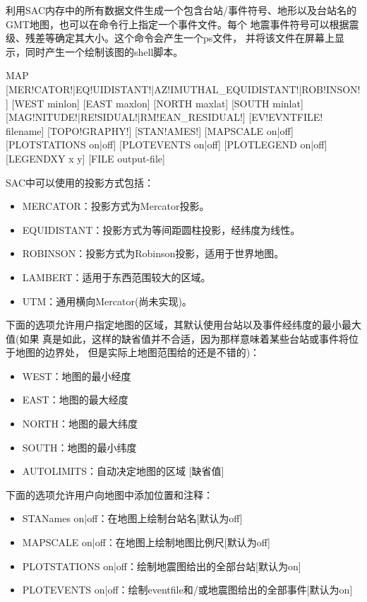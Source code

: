 \label{cmd:map}

利用SAC内存中的所有数据文件生成一个包含台站/事件符号、地形以及台站名的
GMT地图，也可以在命令行上指定一个事件文件。每个
地震事件符号可以根据震级、残差等确定其大小。这个命令会产生一个ps文件，
并将该文件在屏幕上显示，同时产生一个绘制该图的shell脚本。

\begin{SACSTX}
MAP [MER!CATOR!|EQ!UIDISTANT!|AZ!IMUTHAL_EQUIDISTANT!|ROB!INSON!]
    [WEST minlon] [EAST maxlon] [NORTH maxlat] [SOUTH minlat]
    [MAG!NITUDE!|RE!SIDUAL!|RM!EAN_RESIDUAL!] [EV!EVNTFILE! filename]
    [TOPO!GRAPHY!] [STAN!AMES!] [MAPSCALE on|off] [PLOTSTATIONS on|off]
    [PLOTEVENTS on|off] [PLOTLEGEND on|off] [LEGENDXY x y]
    [FILE output-file]
\end{SACSTX}

SAC中可以使用的投影方式包括：
\begin{itemize}
\item MERCATOR：投影方式为Mercator投影。
\item EQUIDISTANT：投影方式为等间距圆柱投影，经纬度为线性。
\item ROBINSON：投影方式为Robinson投影，适用于世界地图。
\item LAMBERT：适用于东西范围较大的区域。
\item UTM：通用横向Mercator(尚未实现)。
\end{itemize}

下面的选项允许用户指定地图的区域，其默认使用台站以及事件经纬度的最小最大值(如果
真是如此，这样的缺省值并不合适，因为那样意味着某些台站或事件将位于地图的边界处，
但是实际上地图范围给的还是不错的)：
\begin{itemize}
\item WEST：地图的最小经度
\item EAST：地图的最大经度
\item NORTH：地图的最大纬度
\item SOUTH：地图的最小纬度
\item AUTOLIMITS：自动决定地图的区域 [缺省值]
\end{itemize}

下面的选项允许用户向地图中添加位置和注释：
\begin{itemize}
\item STANames on|off：在地图上绘制台站名[默认为off]
\item MAPSCALE on|off：在地图上绘制地图比例尺[默认为off]
\item PLOTSTATIONS on|off：绘制地震图给出的全部台站[默认为on]
\item PLOTEVENTS on|off：绘制eventfile和/或地震图给出的全部事件[默认为on]
\end{itemize}

